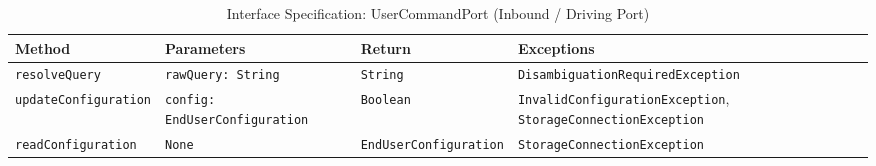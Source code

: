\begin{appendix}
\begin{table}[htbp]
    \centering
    \caption{Interface Specification: UserCommandPort (Inbound / Driving Port)}
    \label{tab:user_command_port}
    \renewcommand{\arraystretch}{1.4} %
    \begin{tabularx}{\textwidth}{|p{3.2cm}|X|l|X|}
        \hline
        \rowcolor{gray!10} %
        \textbf{Method} & \textbf{Parameters} & \textbf{Return} & \textbf{Exceptions} \\
        \hline
        \texttt{resolveQuery} & \texttt{rawQuery: String} & \texttt{String} & \texttt{Disambiguation\-Required\-Exception} \\
        \hline
        \texttt{update\-Configuration} & \texttt{config: EndUser\-Configuration} & \texttt{Boolean} & \texttt{Invalid\-Configuration\-Exception}, \newline \texttt{Storage\-Connection\-Exception} \\
        \hline
        \texttt{read\-Configuration} & \texttt{None} & \texttt{EndUser\-Configuration} & \texttt{\texttt{Storage\-Connection\-Exception}} \\
        \hline
    \end{tabularx}
\end{table}
\FloatBarrier



\end{appendix}
